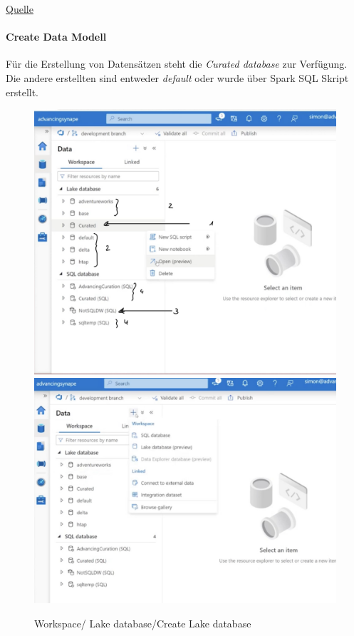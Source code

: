 \href{https://learn.microsoft.com/en-us/azure/synapse-analytics/database-designer/concepts-lake-database}{Quelle}

\paragraph{Create Data Modell}
Für die Erstellung von Datensätzen steht die \textit{Curated database} zur Verfügung. Die andere erstellten sind entweder \textit{default} oder wurde über Spark SQL Skript erstellt.
\begin{figure}[H]
	\centering
	\includegraphics[scale = 0.2]{attachment/chapter_2/Scc138}
		\includegraphics[scale = 0.2]{attachment/chapter_2/Scc139}
	\caption{Workspace/ Lake database/Create Lake database}
\end{figure}

